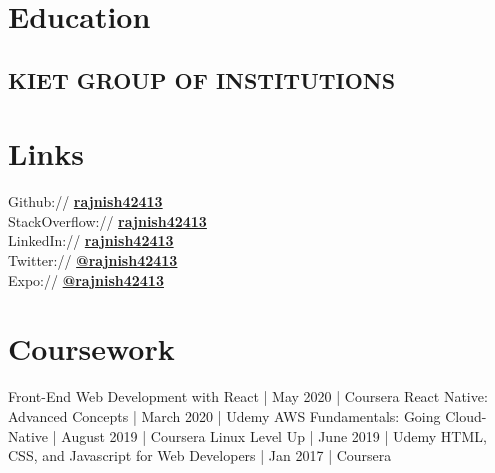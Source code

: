 \documentclass[]{deedy-resume-openfont}
\begin{document}
%
%
\lastupdated

%
%

%
%

\begin{minipage}[t]{0.33\textwidth} 


\section{Education} 
\subsection{KIET GROUP OF INSTITUTIONS}
\sectionsep


\section{Links} 
Github:// \href{https://github.com/rajnish42413}{\bf rajnish42413} \\
StackOverflow:// \href{https://stackoverflow.com/story/rajnish42413}{\bf rajnish42413} \\
LinkedIn://  \href{https://www.linkedin.com/in/rajnish42413}{\bf rajnish42413} \\
Twitter://  \href{https://twitter.com/rajnish42413}{\bf @rajnish42413} \\
Expo://  \href{https://expo.io/@rajnish42413}{\bf @rajnish42413} \\
\sectionsep

\section{Coursework}
Front-End Web Development with React | May 2020 | Coursera
React Native: Advanced Concepts | March 2020 | Udemy
AWS Fundamentals: Going Cloud-Native | August 2019 | Coursera
Linux Level Up | June 2019 | Udemy
HTML, CSS, and Javascript for Web Developers | Jan 2017 | Coursera
\sectionsep


\end{minipage}
\end{document}
